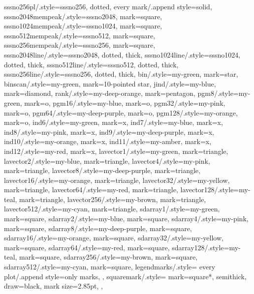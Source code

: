 {  sssno256pl/.style={sssno256, dotted, every mark/.append style={solid}},
  sssno2048mempeak/.style={sssno2048, mark=square},
  sssno1024mempeak/.style={sssno1024, mark=square},
  sssno512mempeak/.style={sssno512, mark=square},
  sssno256mempeak/.style={sssno256, mark=square},
  sssno2048line/.style={sssno2048, dotted, thick},
  sssno1024line/.style={sssno1024, dotted, thick},
  sssno512line/.style={sssno512, dotted, thick},
  sssno256line/.style={sssno256, dotted, thick},
  bin/.style={my-green, mark=star},
  binscan/.style={my-green, mark=10-pointed star},
  jind/.style={my-blue, mark=diamond},
  rank/.style={my-deep-orange, mark=pentagon},
  pgm8/.style={my-green, mark=o},
  pgm16/.style={my-blue, mark=o},
  pgm32/.style={my-pink, mark=o},
  pgm64/.style={my-deep-purple, mark=o}, 
  pgm128/.style={my-orange, mark=o}, 
  ind6/.style={my-green, mark=x},
  ind7/.style={my-blue, mark=x},
  ind8/.style={my-pink, mark=x},
  ind9/.style={my-deep-purple, mark=x},
  ind10/.style={my-orange, mark=x},
  ind11/.style={my-amber, mark=x},
  ind12/.style={my-red, mark=x},
  lavector1/.style={my-green, mark=triangle},
  lavector2/.style={my-blue, mark=triangle},
  lavector4/.style={my-pink, mark=triangle},
  lavector8/.style={my-deep-purple, mark=triangle}, 
  lavector16/.style={my-orange, mark=triangle}, 
  lavector32/.style={my-yellow, mark=triangle},
  lavector64/.style={my-red, mark=triangle}, 
  lavector128/.style={my-teal, mark=triangle}, 
  lavector256/.style={my-brown, mark=triangle}, 
  lavector512/.style={my-cyan, mark=triangle}, 
  sdarray1/.style={my-green, mark=square},
  sdarray2/.style={my-blue, mark=square},
  sdarray4/.style={my-pink, mark=square},
  sdarray8/.style={my-deep-purple, mark=square}, 
  sdarray16/.style={my-orange, mark=square}, 
  sdarray32/.style={my-yellow, mark=square},
  sdarray64/.style={my-red, mark=square}, 
  sdarray128/.style={my-teal, mark=square}, 
  sdarray256/.style={my-brown, mark=square}, 
  sdarray512/.style={my-cyan, mark=square},
  legendmarks/.style={
    every plot/.append style={only marks},
  },
  squaremark/.style={
    mark=square*,
    semithick,
    draw=black,
    mark size=2.85pt,
  },
}


